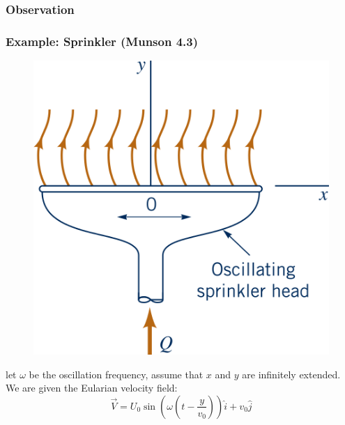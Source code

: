 \subsubsection{Observation}
\begin{center}
\end{center}

\subsubsection{Example: Sprinkler (Munson 4.3)}

\begin{figure}[H]
	\centering
	\includegraphics[width=0.45\linewidth]{Sketches/Sprinkler}
	\label{fig:sprinkler}
\end{figure}

let $\omega$ be the oscillation frequency, assume that $x$ and $y$ are infinitely extended. We are given the Eularian velocity field:
\begin{equation*}
	\vec V = U_0\sin\left(\omega \left( t - \frac {y}{v_0}\right)\right)\hat i + v_0 \hat j
\end{equation*}

